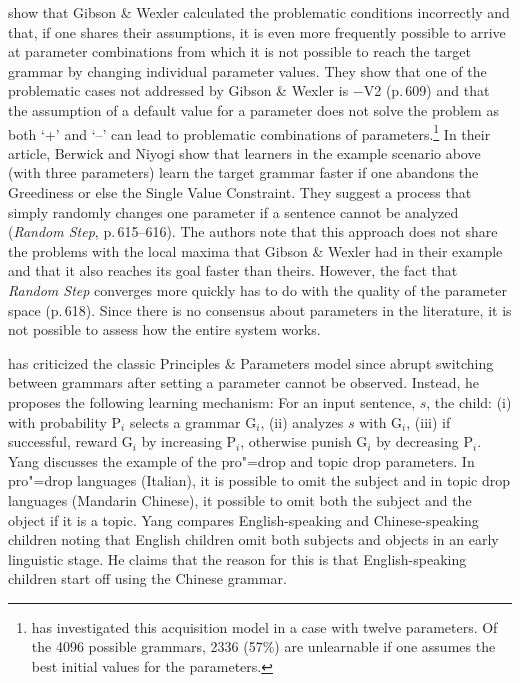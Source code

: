 \citet{BN96a} show that Gibson \& Wexler calculated the problematic conditions incorrectly and
that, if one shares their assumptions, it is even more frequently possible
to arrive at parameter combinations from which it is not possible to reach the target grammar by changing individual parameter values.
They show that one of the problematic cases not addressed by Gibson \& Wexler is $-$V2 (p.\,609) and that the assumption of a default value
for a parameter does not solve the problem as both `+' and `--' can lead to problematic combinations of parameters.\footnote{
  \citet{Kohl99a,Kohl2000a} has investigated this acquisition model in a case with twelve parameters. Of the 4096 possible grammars,
  2336 (57\%) are unlearnable if one assumes the best initial values for the parameters.
}
In their article, Berwick and Niyogi show that learners in the example scenario above (with three
parameters) learn the target grammar faster if one abandons the Greediness 
or else the Single Value Constraint.
They suggest a process that simply randomly changes one parameter if a sentence cannot be analyzed (\emph{Random Step}, p.\,615--616).
The authors note that this approach does not share the problems with the local maxima  that Gibson \& Wexler had in their example and that it also reaches its goal faster
than theirs. However, the fact that \emph{Random Step} converges more quickly has to do with the quality of the parameter space (p.\,618).
Since there is no consensus about parameters in the literature, it is not possible to assess how the entire system works.

\citet[]{Yang2004a} has criticized the classic Principles \& Parameters model since abrupt switching between grammars after setting
a parameter cannot be observed. Instead, he proposes the following learning mechanism:
\ea
For an input sentence, $s$, the child:
(i) with probability P$_i$ selects a grammar G$_i$, (ii) analyzes $s$ with G$_i$, (iii) if successful, reward G$_i$ by increasing P$_i$,
otherwise punish G$_i$ by decreasing P$_i$.
\z
Yang discusses the example of the pro"=drop and topic drop parameters. In pro"=drop languages (\eg Italian),
it is possible to omit the subject and in topic drop languages (\eg Mandarin Chinese), it possible to omit both the subject and the object if it is
a topic. Yang compares English-speaking and Chinese-speaking children noting that English children omit both subjects and objects
in an early linguistic stage. He claims that the reason for this is that English-speaking children start off using the Chinese grammar.

